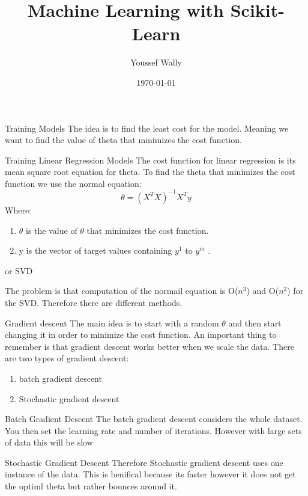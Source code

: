 \documentclass{beamer}
\title[Scikit-Learn]{Machine Learning with Scikit-Learn}
\author{Youssef Wally}
\institute{Ulm University}
\date{\today}
\begin{document}
\begin{frame}
\titlepage
\end{frame}

\begin{frame}{Training Models}
The idea is to find the least cost for the model. Meaning we want to find the value of theta that minimizes the cost function.
\end{frame}
\begin{frame}{Training Linear Regression Models}
The cost function for linear regression is its mean square root equation for theta. To find the theta that minimizes the cost function we use the normal equation:
\begin{equation}
\theta = (X^T X)^{-1}   X^T   y
\end{equation}
Where:
\begin{enumerate}
\item \( \theta \) is the value of \(\theta\)  that minimizes the cost function. 
\item  y is the vector of target values containing \( y^{1}\) to \(y^{m}\) .
\end{enumerate}
or SVD
\end{frame}
\begin{frame}
The problem is that computation of the normail equation is O(\(n^3\)) and O(\(n^2\)) for the SVD. Therefore there are different methods.
\end{frame}
\begin{frame}{Gradient descent}
The main idea is to start with a random \(\theta\) and then start changing it in order to minimize the cost function. An important thing to remember is that gradient descent works better when we scale the data. There are two types of gradient descent:
\begin{enumerate}
\item batch gradient descent
\item Stochastic gradient descent
\end{enumerate}
\end{frame}
\begin{frame}{Batch Gradient Descent}
The batch gradient descent considers the whole dataset. You then set the learning rate and number of iterations. However with large sets of data this will be slow
\end{frame}
\begin{frame}{Stochastic Gradient Descent}
Therefore Stochastic gradient descent uses one instance of the  data. This is benifical because its faster however it does not get the optiml theta but rather bounces around it.
\end{frame}
\end{document}

